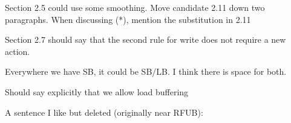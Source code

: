 \documentclass[acmsmall,review,screen]{acmart}\settopmatter{printfolios=true}
\theoremstyle{acmdefinition}
\begin{document}




\maketitle










%


\clearpage
\begin{small}

\end{small}
\clearpage
\appendix
%
%
%
\newpage

\color{red}
Section 2.5 could use some smoothing.    Move candidate 2.11 down two
paragraphs.  When discussing (*), mention the substitution in 2.11

Section 2.7 should say that the second rule for write does not require a new action.

Everywhere we have SB, it could be SB/LB.  I think there is space for both.


Should say explicitly that we allow load buffering


A sentence I like but deleted (originally near RFUB):
\end{document}
